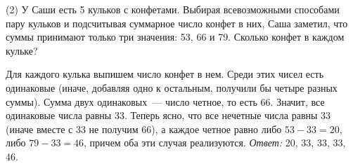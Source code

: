 \textsf{(2)}
У Саши есть 5 кульков с конфетами.
Выбирая всевозможными способами пару кульков и подсчитывая суммарное число
конфет в них, Саша заметил, что суммы принимают только три значения:
53, 66 и 79.
Сколько конфет в каждом кульке?

\solution
Для каждого кулька выпишем число конфет в нем.
Среди этих чисел есть одинаковые
(иначе, добавляя одно к остальным, получили бы четыре разных суммы).
Сумма двух одинаковых~--- число четное, то есть 66.
Значит, все одинаковые числа равны 33.
Теперь ясно, что все нечетные числа равны 33
(иначе вместе с 33 не получим 66), а каждое четное равно
либо $53 - 33 = 20$, либо $79 - 33 = 46$, причем оба эти случая реализуются.
\emph{Ответ:} 20, 33, 33, 33, 46.

